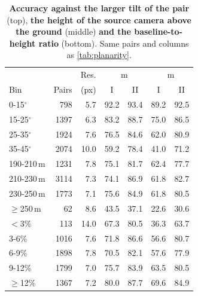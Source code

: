\documentclass[10pt,twocolumn,letterpaper]{article}
\begin{document}
\begin{table}[t]
\centering
\caption{\textbf{Accuracy against the larger tilt of the pair} (top), \textbf{the height of the source camera above the ground} (middle) \textbf{and the baseline-to-height ratio} (bottom). Same pairs and columns as \cref{tab:planarity}.}
\label{tab:planarity_tilt}
\footnotesize
\setlength{\tabcolsep}{4pt}
\begin{tabular}{@{}lrrcccc@{}}
\toprule
& & Res. & \multicolumn{2}{c}{\SRd@1\,m} & \multicolumn{2}{c}{\SRe@1\,m} \\
Bin & Pairs & (px) & I & II & I & II \\
\midrule
0-15$^\circ$ & 798 & 5.7 & 92.2 & 93.4 & 89.2 & 92.5 \\
15-25$^\circ$ & 1397 & 6.3 & 83.2 & 88.7 & 75.0 & 86.5 \\
25-35$^\circ$ & 1924 & 7.6 & 76.5 & 84.6 & 62.0 & 80.9 \\
35-45$^\circ$ & 2074 & 10.0 & 59.2 & 78.4 & 41.0 & 71.2 \\
\midrule
190-210\,m & 1231 & 7.8 & 75.1 & 81.7 & 62.4 & 77.7 \\
210-230\,m & 3114 & 7.3 & 74.1 & 86.9 & 61.8 & 82.7 \\
230-250\,m & 1773 & 7.1 & 75.6 & 84.9 & 61.8 & 80.5 \\
$\geq$250\,m & 62 & 8.6 & 43.5 & 37.1 & 22.6 & 30.6 \\
\midrule
$<$3\% & 113 & 14.0 & 67.3 & 80.5 & 36.3 & 63.7 \\
3-6\% & 1016 & 7.6 & 71.8 & 86.6 & 56.6 & 80.7 \\
6-9\% & 1898 & 7.8 & 70.5 & 82.1 & 57.6 & 77.9 \\
9-12\% & 1799 & 7.0 & 75.7 & 83.9 & 63.5 & 80.5 \\
$\geq$12\% & 1367 & 7.2 & 80.0 & 87.7 & 69.6 & 84.9 \\
\bottomrule
\end{tabular}
\end{table}
\end{document}
